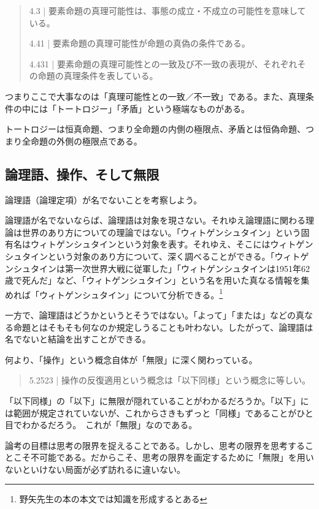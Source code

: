 \documentclass[a4paper,onecolumn,article]{jarticle}
\newcounter{ct}               %
\begin{document}
{\begin{quote}
  4.3 | 要素命題の真理可能性は、事態の成立・不成立の可能性を意味している。

  4.41 | 要素命題の真理可能性が命題の真偽の条件である。

  4.431 | 要素命題の真理可能性との一致及び不一致の表現が、それぞれその命題の真理条件を表している。
\end{quote}

つまりここで大事なのは「真理可能性との一致／不一致」である。また、真理条件の中には「トートロジー」「矛盾」という極端なものがある。

トートロジーは恒真命題、つまり全命題の内側の極限点、矛盾とは恒偽命題、つまり全命題の外側の極限点である。

\subsection{論理語、操作、そして無限}

論理語（論理定項）が名でないことを考察しよう。

論理語が名でないならば、論理語は対象を現さない。それゆえ論理語に関わる理論は世界のあり方についての理論ではない。「ウィトゲンシュタイン」という固有名はウィトゲンシュタインという対象を表す。それゆえ、そこにはウィトゲンシュタインという対象のあり方について、深く調べることができる。「ウィトゲンシュタインは第一次世界大戦に従軍した」「ウィトゲンシュタインは1951年62歳で死んだ」など、「ウィトゲンシュタイン」という名を用いた真なる情報を集めれば「ウィトゲンシュタイン」について分析できる。\footnote{野矢先生の本の本文では知識を形成するとある}

一方で、論理語はどうかというとそうではない。「よって」「または」などの真なる命題とはそもそも何なのか規定しうることも叶わない。したがって、論理語は名でないと結論を出すことができる。

何より、「操作」という概念自体が「無限」に深く関わっている。

\begin{quote}
  5.2523 | 操作の反復適用という概念は「以下同様」という概念に等しい。
\end{quote}

「以下同様」の「以下」に無限が隠れていることがわかるだろうか。「以下」には範囲が規定されていないが、これからさきもずっと「同様」であることがひと目でわかるだろう。 これが「無限」なのである。

論考の目標は思考の限界を捉えることである。しかし、思考の限界を思考することこそ不可能である。だからこそ、思考の限界を画定するために「無限」を用いないといけない局面が必ず訪れるに違いない。

}
\end{document}
